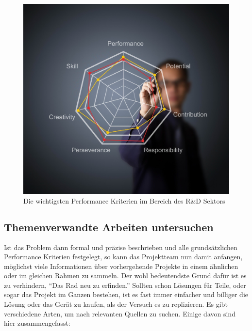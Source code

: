     \begin{figure}[H]
        \centering
        \includegraphics[width=0.5\linewidth]{graphics/kriterien.jpg}
        \caption[Performance Kriterien]{Die wichtigsten Performance Kriterien im Bereich des R\&D Sektors}

        
        \label{fig:kriterien}
    \end{figure}

    \subsection{Themenverwandte Arbeiten untersuchen}

    Ist das Problem dann formal und präzise beschrieben und alle grundsätzlichen Performance 
    Kriterien festgelegt, so kann das Projektteam nun damit anfangen, möglichst viele Informationen 
    über vorhergehende Projekte in einem ähnlichen oder im gleichen Rahmen zu sammeln. Der wohl 
    bedeutendste Grund dafür ist es zu verhindern, “Das Rad neu zu erfinden.” Sollten 
    schon Lösungen für Teile, oder sogar das Projekt im Ganzen bestehen, ist es fast immer 
    einfacher und billiger die Lösung oder das Gerät zu kaufen, als der Versuch es zu replizieren. 
    Es gibt verschiedene Arten, um nach relevanten Quellen zu suchen. Einige davon sind hier 
    zusammengefasst:

